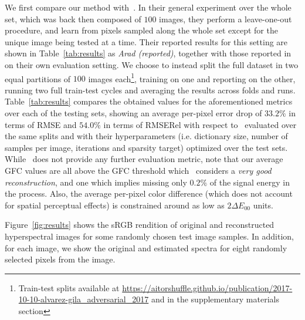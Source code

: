 \documentclass[10pt,twocolumn,letterpaper]{article}
\begin{document}
We first compare our method with~\cite{arad_sparse_2016}. In their general experiment over the whole set, which was back then composed of $100$ images, they perform a leave-one-out procedure, and learn from pixels sampled along the whole set except for the unique image being tested at a time. Their reported results for this setting are shown in Table~\ref{tab:results} as \emph{Arad \etal (reported)}, together with those reported in\cite{galliani_learned_2017} on their own evaluation setting. We choose to instead split the full dataset in two equal partitions of $100$ images each\footnote{Train-test splits available at \url{https://aitorshuffle.github.io/publication/2017-10-10-alvarez-gila_adversarial_2017} and in the supplementary materials section}, training on one and reporting on the other, running two full train-test cycles and averaging the results across folds and runs. Table~\ref{tab:results} compares the obtained values for the aforementioned metrics over each of the testing sets, showing an average per-pixel error drop of $33.2\%$ in terms of RMSE and $54.0\%$ in terms of RMSERel with respect to~\cite{arad_sparse_2016} evaluated over the same splits and with their hyperparameters (i.e. dictionary size, number of samples per image, iterations and sparsity target) optimized over the test sets. While~\cite{arad_sparse_2016} does not provide any further evaluation metric, note that our average GFC values are all above the GFC threshold which~\cite{romero1997linear} considers a \emph{very good reconstruction}, and one which implies missing only $0.2\%$ of the signal energy in the process. Also, the average per-pixel color difference (which does not account for spatial perceptual effects) is constrained around as low as $2\Delta E_{00}$ units.


Figure~\ref{fig:results} shows the sRGB rendition of original and reconstructed hyperspectral images for some randomly chosen test image samples. In addition, for each image, we show the original and estimated spectra for eight randomly selected pixels from the image.

\end{document}
